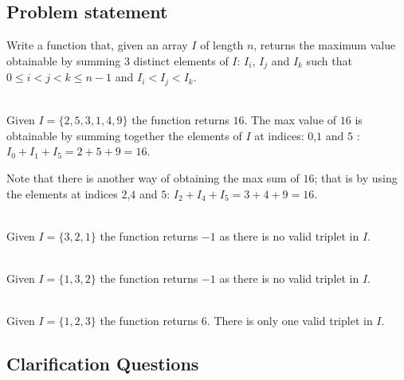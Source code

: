 \subsection{Problem statement}
\begin{exercise}
\label{example:max_triplet:exercice1}
Write a function that, given an array $I$ of length $n$, returns the maximum value obtainable by
summing $3$ distinct elements of $I$: $I_i$, $I_j$ and $I_k$ such that $ 0 \leq i < j < k \leq n-1$
and $ I_i < I_j < I_k $.


	\begin{example}
		\label{example:max_triplet:example1}
		\hfill \\
		Given $I = \{2, 5, 3, 1, 4, 9\}$ the function returns $16$. The max value of $16$ is
		obtainable by summing together the elements of $I$ at indices: $0$,$1$ and $5$ : $I_0 +
		I_1+I_5=2+5+9= 16$.
		
		Note that there is another way of obtaining the max sum of $16$; that is by using the
		elements at indices $2$,$4$ and $5$: $I_2 + I_4+I_5=3+4+9= 16$.
	\end{example}

	\begin{example}
		\label{example:max_triplet:example2}
		\hfill \\
		Given $I = \{3,2,1\}$ the function returns $-1$ as there is no valid triplet in $I$.		
	\end{example}
	
		\begin{example}
			\hfill \\
			Given $I = \{1,3,2\}$ the function returns $-1$ as there is no valid triplet in $I$.
			\label{ex:max_triplet:example2}	
		\end{example}

	\begin{example}
		\hfill \\
		Given $I = \{1,2,3\}$ the function returns $6$. There is only one valid triplet in $I$.
	\label{ex:max_triplet:example3}
	\end{example}
\end{exercise}

\subsection{Clarification Questions}

